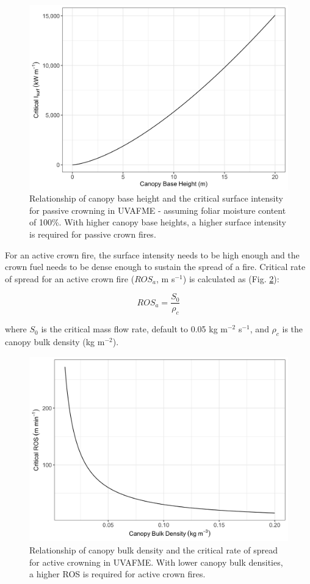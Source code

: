 \documentclass[a4paper, 12pt] {report}
\begin{document}
\begin{figure} 
	\includegraphics[width=\linewidth]{Figures/passivecrowning.png}
	\caption{Relationship of canopy base height and the critical surface intensity for passive crowning in UVAFME - assuming foliar moisture content of 100\%.  With higher canopy base heights, a higher surface intensity is required for passive crown fires.}
	\label{fig:passivecrowning}
\end{figure}

For an active crown fire, the surface intensity needs to be high enough and the crown fuel needs to be dense enough to sustain the spread of a fire.  Critical rate of spread for an active crown fire ($ROS_a$, m s$^{-1}$) is calculated as (Fig. \ref{fig:activecrowning}):

\begin{equation}
	ROS_a = \frac{S_0}{\rho_c}
\end{equation}

where $S_0$ is the critical mass flow rate, default to 0.05 kg m$^{-2}$ s$^{-1}$, and $\rho_c$ is the canopy bulk density (kg m$^{-2}$). 

\begin{figure} 
	\includegraphics[width=\linewidth]{figures/activecrowning.png}
	\caption{Relationship of canopy bulk density and the critical rate of spread for active crowning in UVAFME. With lower canopy bulk densities, a higher ROS is required for active crown fires.}
	\label{fig:activecrowning}
\end{figure}
\end{document}
